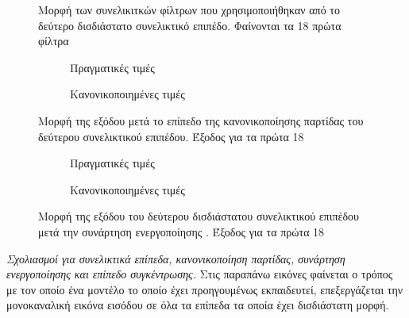 \begin{figure}[H]
  \begin{center}
    
    \caption{Μορφή των συνελικιτκών φίλτρων που χρησιμοποιήθηκαν από το δεύτερο δισδιάστατο συνελικτικό επιπέδο. Φαίνονται τα  18 πρώτα φίλτρα}
  \end{center}
\end{figure}

\begin{figure}[htbp]
    \begin{subfigure}{0.5\textwidth}
        
        \caption{Πραγματικές τιμές}
        \label{fig:subim9}
    \end{subfigure}
    \begin{subfigure}{0.5\textwidth}
        
        \caption{Κανονικοποιημένες τιμές}
        \label{fig:subim10}
    \end{subfigure}
    \caption{Μορφή της εξόδου μετά το επίπεδο της κανονικοποίησης παρτίδας του δεύτερου συνελικτικού επιπέδου. Έξοδος για τα πρώτα 18 }
\end{figure}

\begin{figure}[htbp]
    \begin{subfigure}{0.5\textwidth}
        
        \caption{Πραγματικές τιμές}
        \label{fig:subim11}
    \end{subfigure}
    \begin{subfigure}{0.5\textwidth}
        
        \caption{Κανονικοποιημένες τιμές}
        \label{fig:subim12}
    \end{subfigure}
    \caption{Μορφή της εξόδου του δεύτερου δισδιάστατου συνελικτικού επιπέδου μετά την συνάρτηση ενεργοποίησης . Έξοδος για τα πρώτα 18 }
\end{figure}

\textit{Σχολιασμοί για συνελικτικά επίπεδα, κανονικοποίηση παρτίδας, συνάρτηση ενεργοποίησης και επίπεδο συγκέντρωσης.}
Στις παραπάνω εικόνες φαίνεται ο τρόπος με τον οποίο ένα μοντέλο το οποίο έχει προηγουμένως εκπαιδευτεί, επεξεργάζεται την μονοκαναλική εικόνα εισόδου σε όλα τα επίπεδα τα οποία έχει δισδιάστατη μορφή. 